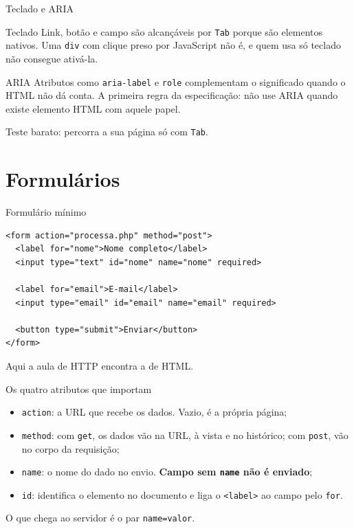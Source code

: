 \documentclass{beamer}
\begin{document}
\begin{frame}{Teclado e ARIA}
  \begin{block}{Teclado}
    Link, botão e campo são alcançáveis por \texttt{Tab} porque são elementos
    nativos. Uma \texttt{div} com clique preso por JavaScript não é, e quem usa
    só teclado não consegue ativá-la.
  \end{block}

  \vspace{0.4cm}
  \begin{block}{ARIA}
    Atributos como \texttt{aria-label} e \texttt{role} complementam o significado
    quando o HTML não dá conta. A primeira regra da especificação: não use ARIA
    quando existe elemento HTML com aquele papel.
  \end{block}

  \vspace{0.3cm}
  \small Teste barato: percorra a sua página só com \texttt{Tab}.
\end{frame}

\section{Formulários}

\begin{frame}[fragile]{Formulário mínimo}
  \begin{verbatim}
<form action="processa.php" method="post">
  <label for="nome">Nome completo</label>
  <input type="text" id="nome" name="nome" required>

  <label for="email">E-mail</label>
  <input type="email" id="email" name="email" required>

  <button type="submit">Enviar</button>
</form>
  \end{verbatim}

  \vspace{0.2cm}
  \small Aqui a aula de HTTP encontra a de HTML.
\end{frame}

\begin{frame}{Os quatro atributos que importam}
  \begin{itemize}
    \item \texttt{action}: a URL que recebe os dados. Vazio, é a própria página;
    \item \texttt{method}: com \texttt{get}, os dados vão na URL, à vista e no
          histórico; com \texttt{post}, vão no corpo da requisição;
    \item \texttt{name}: o nome do dado no envio. \textbf{Campo sem
          \texttt{name} não é enviado};
    \item \texttt{id}: identifica o elemento no documento e liga o
          \texttt{<label>} ao campo pelo \texttt{for}.
  \end{itemize}

  \vspace{0.4cm}
  O que chega ao servidor é o par \texttt{name=valor}.
\end{frame}
\end{document}
